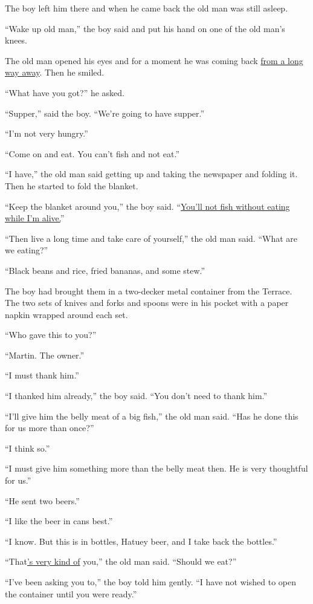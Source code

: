 \documentclass[fontset=ubuntu]{ctexrep}
\begin{document}
The boy left him there and when he came back the old man was still asleep.

``Wake up old man,'' the boy said and put his hand on one of the old man's
knees.

The old man opened his eyes and for a moment he was coming back \uline{from
  a long way away}. Then he smiled.

``What have you got?'' he asked.

``Supper,'' said the boy. ``We're going to have supper.''

``I'm not very hungry.''

``Come on and eat. You can't fish and not eat.''

``I have,'' the old man said getting up and taking the newspaper and \gls{folding} it. Then he started to fold the blanket.

``Keep the blanket around you,'' the boy said. ``\uline{You'll not fish without
eating while I'm alive.}''

``Then live a long time and take care of yourself,'' the old man said. ``What are we eating?''

``Black beans and rice, \gls{fried} bananas, and some \gls{stew}.''

The boy had brought them in a two\gls{-decker} metal container from the
Terrace. The two \gls{sets} of knives and forks and \glspl{spoon} were in his pocket with
a paper \gls{napkin} wrapped around each set.

``Who gave this to you?''

``Martin. The owner.''

``I must thank him.''

``I thanked him already,'' the boy said. ``You don't need to thank him.''

``I'll give him the \gls{belly} meat of a big fish,'' the old man said. ``Has he done this for us more than once?''

``I think so.''

``I must give him something more than the belly meat then. He is very \gls{thoughtful} for us.''

``He sent two beers.''

``I like the beer in \glspl{can} best.''

``I know. But this is in bottles, Hatuey beer, and I take back the bottles.''

``That\uline{'s very kind of} you,'' the old man said. ``Should we eat?''

``I've been asking you to,'' the boy told him gently. ``I have not wished to open the container until you were ready.''
\end{document}

